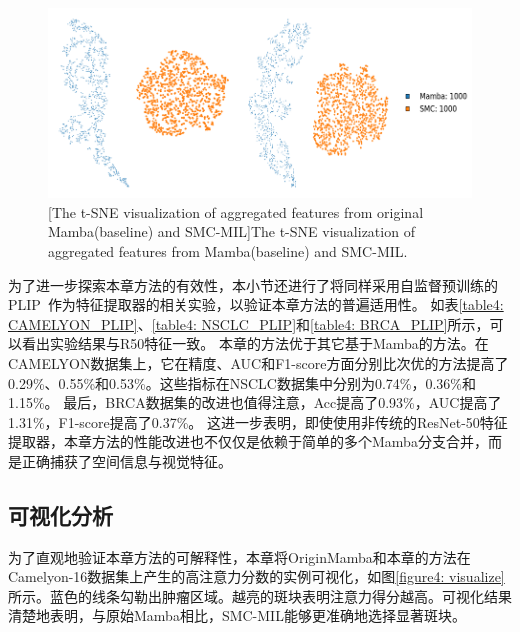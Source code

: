 \begin{figure}[h!]
  \centering
  \includegraphics[width=0.8\columnwidth]{figures/t-SNE.png}
  [The t-SNE visualization of aggregated features from original Mamba(baseline) and SMC-MIL]{The t-SNE visualization of aggregated features from Mamba(baseline) and SMC-MIL.}
  \label{figure4: tSNE}
\end{figure}


为了进一步探索本章方法的有效性，本小节还进行了将同样采用自监督预训练的PLIP~\cite{huang2023visual}作为特征提取器的相关实验，以验证本章方法的普遍适用性。
如表\ref{table4: CAMELYON_PLIP}、\ref{table4: NSCLC_PLIP}和\ref{table4: BRCA_PLIP}所示，可以看出实验结果与R50特征一致。
本章的方法优于其它基于Mamba的方法。在CAMELYON数据集上，它在精度、AUC和F1-score方面分别比次优的方法提高了0.29\%、0.55\%和0.53\%。这些指标在NSCLC数据集中分别为0.74\%，0.36\%和1.15\%。
最后，BRCA数据集的改进也值得注意，Acc提高了0.93\%，AUC提高了1.31\%，F1-score提高了0.37\%。
这进一步表明，即使使用非传统的ResNet-50特征提取器，本章方法的性能改进也不仅仅是依赖于简单的多个Mamba分支合并，而是正确捕获了空间信息与视觉特征。



\subsection[\hspace{-2pt}可视化分析]{{\heiti{} \hspace{-8pt}可视化分析}}\label{section4: 可视化分析}






为了直观地验证本章方法的可解释性，本章将OriginMamba和本章的方法在Camelyon-16数据集上产生的高注意力分数的实例可视化，如图\ref{figure4: visualize}所示。蓝色的线条勾勒出肿瘤区域。越亮的斑块表明注意力得分越高。可视化结果清楚地表明，与原始Mamba相比，SMC-MIL能够更准确地选择显著斑块。
 
